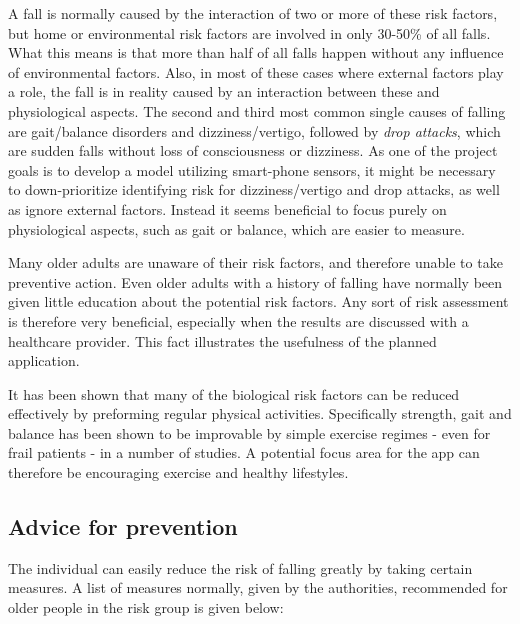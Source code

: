A fall is normally caused by the interaction of two or more of these risk factors, but home or environmental risk factors are involved in only 30-50\% of all falls\cite{fallsRubenstein, cdcComProg}. What this means is that more than half of all falls happen without any influence of environmental factors. Also, in most of these cases where external factors play a role, the fall is in reality caused by an interaction between these and physiological aspects. The second and third most common single causes of falling are gait/balance disorders and dizziness/vertigo, followed by \emph{drop attacks}, which are sudden falls without loss of consciousness or dizziness\cite{fallsRubenstein}. As one of the project goals is to develop a model utilizing smart-phone sensors, it might be necessary to down-prioritize identifying risk for dizziness/vertigo and drop attacks, as well as ignore external factors. Instead it seems beneficial to focus purely on physiological aspects, such as gait or balance, which are easier to measure. 

Many older adults are unaware of their risk factors, and therefore unable to take preventive action. Even older adults with a history of falling have normally been given little education about the potential risk factors. Any sort of risk assessment is therefore very beneficial, especially when the results are discussed with a healthcare provider\cite{cdcComProg}. This fact illustrates the usefulness of the planned application. 

It has been shown that many of the biological risk factors can be reduced effectively by preforming regular physical activities. Specifically strength, gait and balance has been shown to be improvable by simple exercise regimes - even for frail patients - in a number of studies\cite{cdcComProg, WHO, LMTassessPrev}. A potential focus area for the app can therefore be encouraging exercise and healthy lifestyles.

\subsection{Advice for prevention}
The individual can easily reduce the risk of falling greatly by taking certain measures. A list of measures normally, given by the authorities, recommended for older people in the risk group is given below\cite{cdcYouPrevent}:

